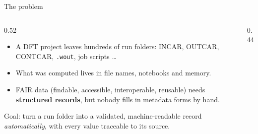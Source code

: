 \documentclass[aspectratio=169,10pt,t]{beamer}
\newcommand{\code}[1]{\texttt{#1}}
\begin{document}
\begin{frame}{The problem}
\begin{columns}[T]
\begin{column}{0.52\textwidth}
\begin{itemize}
\item A DFT project leaves hundreds of run folders: INCAR, OUTCAR, CONTCAR, \code{.wout}, job scripts \dots
\item What was computed lives in file names, notebooks and memory.
\item FAIR data (findable, accessible, interoperable, reusable) needs \textbf{structured records}, but nobody fills
      in metadata forms by hand.
\end{itemize}
\vspace{2mm}
\begin{keyline}\small
Goal: turn a run folder into a validated, machine-readable record \emph{automatically}, with every value traceable to its source.
\end{keyline}
\end{column}
\begin{column}{0.44\textwidth}
\end{column}
\end{columns}
\end{frame}
\end{document}
